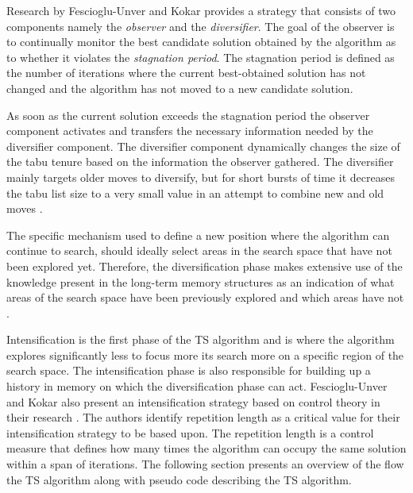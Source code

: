 Research by Fescioglu-Unver and Kokar \cite{SelfControllingReactiveTabu} provides a strategy that consists of two components namely the \emph{observer} and the \emph{diversifier}. The goal of the observer is to continually monitor the best candidate solution obtained by the algorithm as to whether it violates the \emph{stagnation period}. The stagnation period is defined as the number of iterations where the current best-obtained solution has not changed and the algorithm has not moved to a new candidate solution\cite{SelfControllingReactiveTabu}. 

As soon as the current solution exceeds the stagnation period the observer component activates and transfers the necessary information needed by the diversifier component. The diversifier component dynamically changes the size of the tabu tenure based on the information the observer gathered. The diversifier mainly targets older moves to diversify, but for short bursts of time it decreases the tabu list size to a very small value in an attempt to combine new and old moves \cite{SelfControllingReactiveTabu}.

The specific mechanism used to define a new position where the algorithm can continue to search, should ideally select areas in the search space that have not been explored yet\cite{NonlinearGlobalTabu,SelfControllingReactiveTabu}. Therefore, the diversification phase makes extensive use of the knowledge present in the long-term memory structures as an indication of what areas of the search space have been previously explored and which areas have not \cite{NonlinearGlobalTabu,SelfControllingReactiveTabu}.

Intensification is the first phase of the \gls{TS} algorithm and is where the algorithm explores significantly less to focus more its search more on a specific region of the search space. The intensification phase is also responsible for building up a history in memory on which the diversification phase can act. Fescioglu-Unver and Kokar also present an intensification strategy based on control theory in their research \cite{SelfControllingReactiveTabu}. The authors identify repetition length as a critical value for their intensification strategy to be based upon. The repetition length is a control measure that defines how many times the algorithm can occupy the same solution within a span of iterations. The following section presents an overview of the flow the \gls{TS} algorithm along with pseudo code describing the \gls{TS} algorithm.
